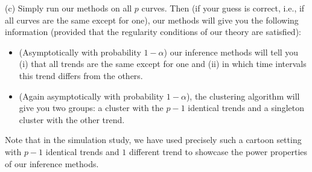 \documentclass[a4paper,12pt]{article}
\begin{document}
\begin{enumerate}[label=\arabic*.,leftmargin=0.6cm]
(c) Simply run our methods on all $p$ curves. Then (if your guess is correct, i.e., if all curves are the same except for one), our methods will give you the following information (provided that the regularity conditions of our theory are satisfied): 
\begin{itemize}[itemsep=0pt,topsep=0pt,leftmargin=1.5cm]
\item (Asymptotically with probability $1-\alpha$) our inference methods will tell you (i) that all trends are the same except for one and (ii) in which time intervals this trend differs from the others. 
\item (Again asymptotically with probability $1-\alpha$), the clustering algorithm will give you two groups: a cluster with the $p-1$ identical trends and a singleton cluster with the other trend. 
\end{itemize}
Note that in the simulation study, we have used precisely such a cartoon setting with $p-1$ identical trends and $1$ different trend to showcase the power properties of our inference methods. 





\end{enumerate}
\end{document}
